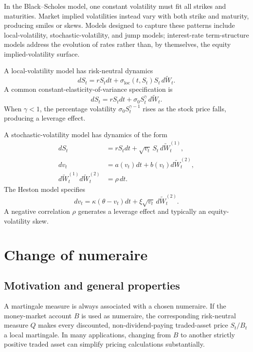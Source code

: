 In the Black--Scholes model, one constant volatility must fit all strikes and maturities. Market implied volatilities instead vary with both strike and maturity, producing smiles or skews. Models designed to capture these patterns include local-volatility, stochastic-volatility, and jump models; interest-rate term-structure models address the evolution of rates rather than, by themselves, the equity implied-volatility surface.

\begin{de}
A local-volatility model has risk-neutral dynamics
\[
dS_t=rS_tdt+\sigma_{\mathrm{loc}}(t,S_t)S_t\,d\widetilde W_t.
\]
A common constant-elasticity-of-variance specification is
\[
dS_t=rS_tdt+\sigma_0S_t^{\gamma}\,d\widetilde W_t.
\]
When $\gamma<1$, the percentage volatility $\sigma_0S_t^{\gamma-1}$ rises as the stock price falls, producing a leverage effect.
\end{de}

\begin{de}
A stochastic-volatility model has dynamics of the form
\[
\begin{aligned}
dS_t&=rS_tdt+\sqrt{v_t}\,S_t\,d\widetilde W_t^{(1)},\\
dv_t&=a(v_t)dt+b(v_t)d\widetilde W_t^{(2)},\\
d\widetilde W_t^{(1)}d\widetilde W_t^{(2)}&=\rho\,dt.
\end{aligned}
\]
The Heston model specifies
\[
dv_t=\kappa(\theta-v_t)dt+\xi\sqrt{v_t}\,d\widetilde W_t^{(2)}.
\]
A negative correlation $\rho$ generates a leverage effect and typically an equity-volatility skew.
\end{de}

\section{Change of numeraire}

\subsection{Motivation and general properties}

A martingale measure is always associated with a chosen numeraire. If the money-market account $B$ is used as numeraire, the corresponding risk-neutral measure $Q$ makes every discounted, non-dividend-paying traded-asset price $S_t/B_t$ a local martingale. In many applications, changing from $B$ to another strictly positive traded asset can simplify pricing calculations substantially.

